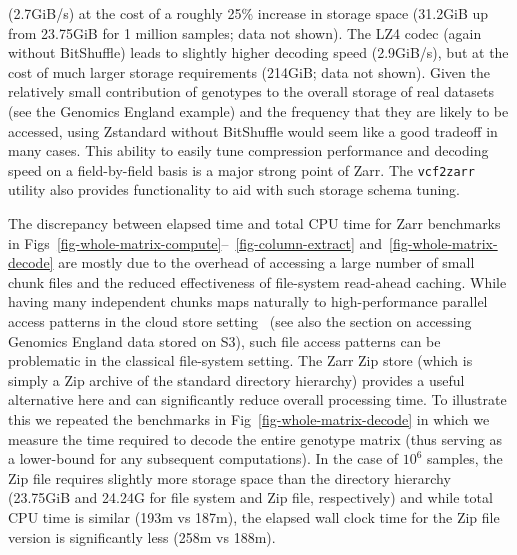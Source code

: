 \documentclass[a4paper,num-refs]{oup-contemporary}
\begin{document}
(2.7GiB/s) at the cost of a roughly 25\% increase in storage
space (31.2GiB up from 23.75GiB for 1 million samples; data not
shown). The LZ4 codec (again without BitShuffle) leads to slightly higher
decoding speed (2.9GiB/s), but at the cost of much larger storage requirements 
(214GiB; data not shown).
Given the relatively small contribution of genotypes to the
overall storage of real datasets (see the Genomics England example)
and the frequency that they are likely to be accessed, using 
Zstandard without BitShuffle 
would seem like a good tradeoff in many cases.
This ability to easily tune compression performance
and decoding speed on a field-by-field basis is a major strong
point of Zarr. The \texttt{vcf2zarr} utility also provides
functionality to aid with such storage schema tuning.

The discrepancy between elapsed time and total CPU time for Zarr 
benchmarks in
Figs~\ref{fig-whole-matrix-compute}--~\ref{fig-column-extract}
and~\ref{fig-whole-matrix-decode} are mostly due to the overhead
of accessing a large number of small chunk files and the reduced
effectiveness of file-system read-ahead caching.
While having many independent chunks maps 
naturally to high-performance parallel access patterns
in the cloud store setting~\citep{durner2023exploiting} 
(see also the section on accessing Genomics England data stored on S3), 
such file access patterns can be problematic in the 
classical file-system setting.
The Zarr Zip store (which is simply a Zip archive of the standard directory 
hierarchy) provides a useful alternative here and can 
significantly reduce overall processing time. To illustrate this
we repeated the benchmarks in Fig~\ref{fig-whole-matrix-decode} in
which we measure the time required to decode the entire genotype
matrix (thus serving as a lower-bound for any subsequent computations).
In the case of $10^6$ samples, the Zip file requires slightly more 
storage space than the directory hierarchy (23.75GiB and 24.24G
for file system and Zip file, respectively)
and while total 
CPU time is similar (193m vs 187m), the elapsed wall clock
time for the Zip file version is significantly less 
(258m vs 188m).
\end{document}

